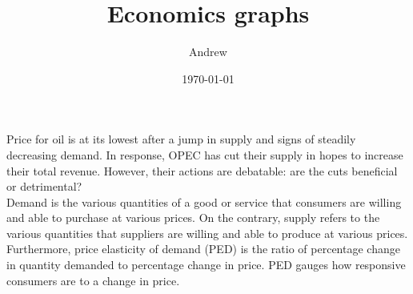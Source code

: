 \documentclass[12pt]{article}
\title{Economics graphs}
\author{Andrew}
\date{\today}
\begin{document}

Price for oil is at its lowest after a jump in supply and signs of steadily decreasing demand. In response, OPEC has cut their supply in hopes to increase their total revenue. However, their actions are debatable: are the cuts beneficial or detrimental? \\

Demand is the various quantities of a good or service that consumers are willing and able to purchase at various prices. On the contrary, supply refers to the various quantities that suppliers are willing and able to produce at various prices. Furthermore, price elasticity of demand (PED) is the ratio of percentage change in quantity demanded to percentage change in price. PED gauges how responsive consumers are to a change in price.


\end{document}
